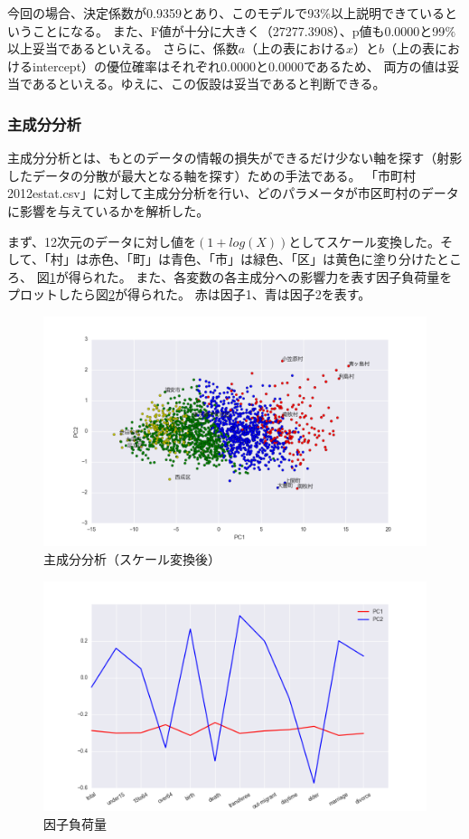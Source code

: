 \documentclass[a4paper,xelatex,ja=standard,jafont=hiragino-pron, 10pt]{bxjsarticle}
\begin{document}
今回の場合、決定係数が0.9359とあり、このモデルで93$\%$以上説明できているということになる。
また、F値が十分に大きく（27277.3908）、p値も0.0000と99$\%$以上妥当であるといえる。
さらに、係数$a$（上の表における$x$）と$b$（上の表におけるintercept）の優位確率はそれぞれ0.0000と0.0000であるため、
両方の値は妥当であるといえる。ゆえに、この仮設は妥当であると判断できる。

\subsubsection{主成分分析}

主成分分析とは、もとのデータの情報の損失ができるだけ少ない軸を探す（射影したデータの分散が最大となる軸を探す）ための手法である。
「市町村 2012estat.csv」に対して主成分分析を行い、どのパラメータが市区町村のデータに影響を与えているかを解析した。

まず、12次元のデータに対し値を$(1+log(X))$としてスケール変換した。そして、「村」は赤色、「町」は青色、「市」は緑色、「区」は黄色に塗り分けたところ、
図\ref{pca}が得られた。
また、各変数の各主成分への影響⼒を表す因子負荷量をプロットしたら図\ref{pca_model}が得られた。
赤は因子1、青は因子2を表す。

\begin{figure}[ht]
  \centering
  \includegraphics[width=15cm]{../data/picture/factor_log.png}
  \caption{主成分分析（スケール変換後）}
  \label{pca}
\end{figure}

\begin{figure}[ht]
  \centering
  \includegraphics[width=15cm]{../data/picture/factor_components.png}
  \caption{因子負荷量}
  \label{pca_model}
\end{figure}
\end{document}
